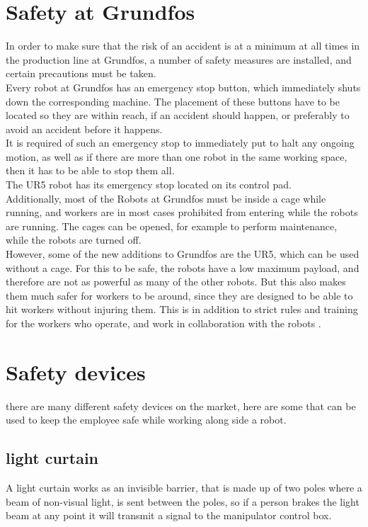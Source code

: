 \section{Safety at Grundfos}\label{ch:Safety at Grundfos}
In order to make sure that the risk of an accident is at a minimum at all times in the production line at Grundfos, a number of safety measures are installed, and certain precautions must be taken.\\

Every robot at Grundfos has an emergency stop button, which immediately shuts down the corresponding machine. The placement of these buttons have to be located so they are within reach, if an accident should happen, or preferably to avoid an accident before it happens. \\
It is required of such an emergency stop to immediately put to halt any ongoing motion, as well as if there are more than one robot in the same working space, then it has to be able to stop them all.\\
The UR5 robot has its emergency stop located on its control pad.\\

Additionally, most of the Robots at Grundfos must be inside a cage while running, and workers are in most cases prohibited from entering while the robots are running. The cages can be opened, for example to perform maintenance, while the robots are turned off.\\

However, some of the new additions to Grundfos are the UR5, which can be used without a cage. For this to be safe, the robots have a low maximum payload, and therefore are not as powerful as many of the other robots. But this also makes them much safer for workers to be around, since they are designed to be able to hit workers without injuring them. This is in addition to strict rules and training for the workers who operate, and work in collaboration with the robots \cite{Safety at Grundfos}. \\

\section{Safety devices}\label{SafetyDevices}
there are many different safety devices  on the market, here are some that can be used to keep the employee safe while working along side a robot.\\

\subsection{light curtain}
A light curtain works as an invisible barrier, that is made up of two poles where a beam of non-visual light, is sent between the poles, so if a person brakes the light beam at any point it will transmit a signal to the manipulator control box\cite{ligthcurtian}.\\

